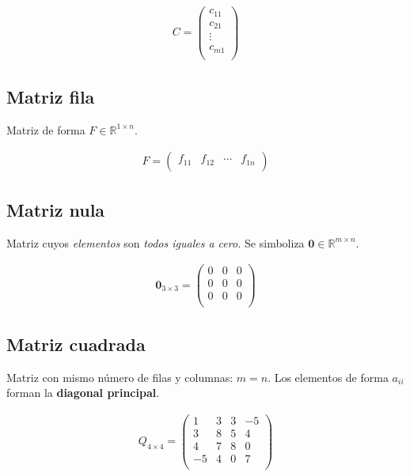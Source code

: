 \documentclass[12pt]{article}
\begin{document}
\begin{align*}
  C = \begin{pmatrix}
        c_{11} \\
        c_{21} \\
        \vdots \\
        c_{m1} \\
      \end{pmatrix}
\end{align*}

\subsection{Matriz fila}

Matriz de forma \(F \in \mathbb{R}^{1 \times n}\).

\begin{align*}
  F = \begin{pmatrix}
        f_{11} & f_{12} & \cdots & f_{1n} \\
      \end{pmatrix}
\end{align*}

\subsection{Matriz nula}

Matriz cuyos \textit{elementos} son \textit{todos iguales a cero.}
Se simboliza \(\mathbf{0} \in \mathbb{R}^{m \times n}\).

\begin{align*}
  \mathbf{0}_{3 \times 3} = \begin{pmatrix}
                              0 & 0 & 0 \\
                              0 & 0 & 0 \\
                              0 & 0 & 0 \\
                            \end{pmatrix}
\end{align*}

\subsection{Matriz cuadrada}

Matriz con mismo número de filas y columnas: \(m = n\).
Los elementos de forma \(a_{ii}\) forman la \textbf{diagonal principal}.

\begin{align*}
  Q_{4 \times 4} = \begin{pmatrix}
                     1  & 3 & 3 & -5 \\
                     3  & 8 & 5 & 4  \\
                     4  & 7 & 8 & 0  \\
                     -5 & 4 & 0 & 7  \\
                   \end{pmatrix}
\end{align*}
\end{document}
